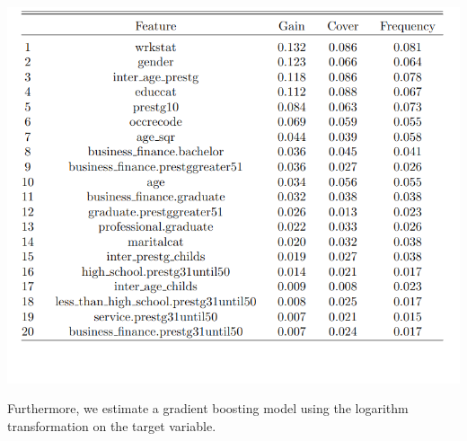 \documentclass[11pt,a4paper]{article}
\let\origfigure\figure
\let\endorigfigure\endfigure
\renewenvironment{figure}[1][2] {
    \expandafter\origfigure\expandafter[H]
} {
    \endorigfigure
}
\begin{document}
\begin{figure}
\centering
\includegraphics{includes/GB_importance.png}
\caption{Top 20 of Features Importance for Gradient Boosting}
\end{figure}

Furthermore, we estimate a gradient boosting model using the logarithm
transformation on the target variable.
\end{document}
